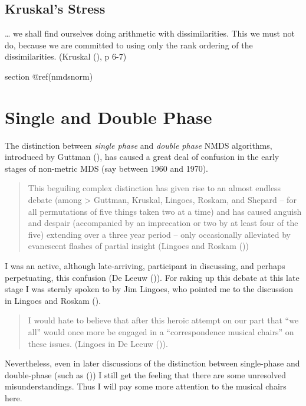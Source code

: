 \documentclass[
  12pt,
  letterpaper,
  DIV=11,
  numbers=noendperiod]{scrreprt}
\theoremstyle{remark}
\begin{document}
\subsection{Kruskal's Stress}\label{kruskals-stress-1}

\ldots{} we shall find ourselves doing arithmetic with dissimilarities.
This we must not do, because we are committed to using only the rank
ordering of the dissimilarities. (Kruskal
(), p 6-7)

section @ref(nmdsnorm)

\section{Single and Double Phase}\label{nmssingledouble}

The distinction between \emph{single phase} and \emph{double phase} NMDS
algorithms, introduced by Guttman (), has
caused a great deal of confusion in the early stages of non-metric MDS
(say between 1960 and 1970).

\begin{quote}
This beguiling complex distinction has given rise to an almost endless
debate (among \textgreater{} Guttman, Kruskal, Lingoes, Roskam, and
Shepard -- for all permutations of five things taken two at a time) and
has caused anguish and despair (accompanied by an imprecation or two by
at least four of the five) extending over a three year period -- only
occasionally alleviated by evanescent flashes of partial insight
(Lingoes and Roskam ())
\end{quote}

I was an active, although late-arriving, participant in discussing, and
perhaps perpetuating, this confusion (De Leeuw
()). For raking up this debate at
this late stage I was sternly spoken to by Jim Lingoes, who pointed me
to the discussion in Lingoes and Roskam
().

\begin{quote}
I would hate to believe that after this heroic attempt on our part that
``we all'' would once more be engaged in a ``correspondence musical
chairs'' on these issues. (Lingoes in De Leeuw
()).
\end{quote}

Nevertheless, even in later discussions of the distinction between
single-phase and double-phase (such as
()) I still get the
feeling that there are some unresolved misunderstandings. Thus I will
pay some more attention to the musical chairs here.
\end{document}
